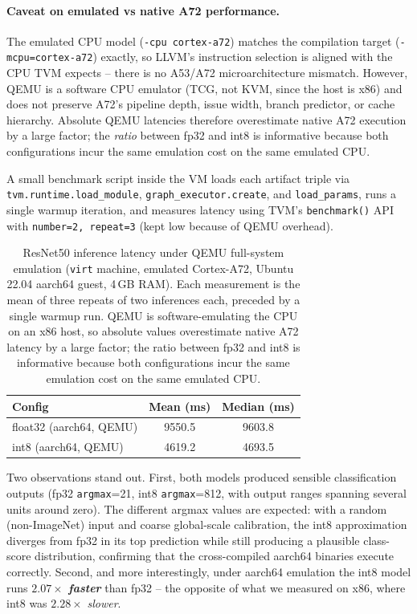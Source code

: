 \documentclass[11pt,a4paper]{article}
\begin{document}
\paragraph{Caveat on emulated vs native A72 performance.} The emulated CPU model (\texttt{-cpu cortex-a72}) matches the compilation target (\texttt{-mcpu=cortex-a72}) exactly, so LLVM's instruction selection is aligned with the CPU TVM expects -- there is no A53/A72 microarchitecture mismatch. However, QEMU is a software CPU emulator (TCG, not KVM, since the host is x86) and does not preserve A72's pipeline depth, issue width, branch predictor, or cache hierarchy. Absolute QEMU latencies therefore overestimate native A72 execution by a large factor; the \emph{ratio} between fp32 and int8 is informative because both configurations incur the same emulation cost on the same emulated CPU.

A small benchmark script inside the VM loads each artifact triple via \texttt{tvm.runtime.\allowbreak load\_module}, \texttt{graph\_executor.create}, and \texttt{load\_params}, runs a single warmup iteration, and measures latency using TVM's \texttt{benchmark()} API with \texttt{number=2, repeat=3} (kept low because of QEMU overhead).

\begin{table}[h]
\centering
\begin{tabular}{lcc}
\toprule
\textbf{Config} & \textbf{Mean (ms)} & \textbf{Median (ms)} \\
\midrule
float32 (aarch64, QEMU) & 9550.5 & 9603.8 \\
int8    (aarch64, QEMU) & 4619.2 & 4693.5 \\
\bottomrule
\end{tabular}
\caption{ResNet50 inference latency under QEMU full-system emulation (\texttt{virt} machine, emulated Cortex-A72, Ubuntu 22.04 aarch64 guest, 4\,GB RAM). Each measurement is the mean of three repeats of two inferences each, preceded by a single warmup run. QEMU is software-emulating the CPU on an x86 host, so absolute values overestimate native A72 latency by a large factor; the ratio between fp32 and int8 is informative because both configurations incur the same emulation cost on the same emulated CPU.}
\label{tab:virt-resnet50}
\end{table}

Two observations stand out. First, both models produced sensible classification outputs (fp32 \texttt{argmax}=21, int8 \texttt{argmax}=812, with output ranges spanning several units around zero). The different argmax values are expected: with a random (non-ImageNet) input and coarse global-scale calibration, the int8 approximation diverges from fp32 in its top prediction while still producing a plausible class-score distribution, confirming that the cross-compiled aarch64 binaries execute correctly. Second, and more interestingly, under aarch64 emulation the int8 model runs \textbf{$2.07\times$ \emph{faster}} than fp32 -- the opposite of what we measured on x86, where int8 was $2.28\times$ \emph{slower}.
\end{document}
